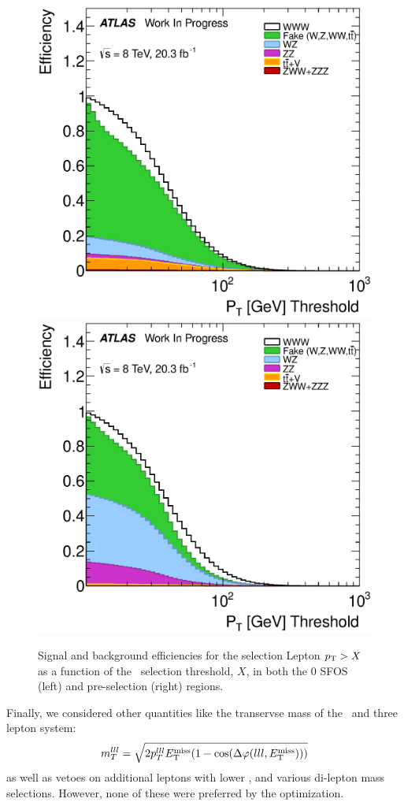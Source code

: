 \begin{figure}[ht!]
\centering
\includegraphics[width=0.45\columnwidth]{figures/optimization/SignalRegionsPreselection_0SFOS_Efficiencies/AllLeptonPt_Cumulative.eps}
\includegraphics[width=0.45\columnwidth]{figures/optimization/SignalRegions_0p5mmZ0_Preselection_Efficiencies/AllLeptonPt_Cumulative.eps}
\caption{ Signal and background efficiencies 
for the selection
Lepton $p_{\mathrm{T}} > X$
as a function of the \pt~selection
threshold, $X$, in both the 0 SFOS (left) and pre-selection (right) regions.  }
\label{fig:pt_eff}
\end{figure}

Finally, we considered other quantities like the 
transervse mass of the \MET~and three lepton system:
\begin{equation}
m_{T}^{lll} = \sqrt{2p_{T}^{lll}E_{\mathrm{T}}^{\mathrm{miss}}(1-\cos(\Delta\varphi(lll,E_{\mathrm{T}}^{\mathrm{miss}})))}
\end{equation}
as well as vetoes on additional leptons with lower \pt, and various
di-lepton mass selections.  However, none of these were preferred
by the optimization.


